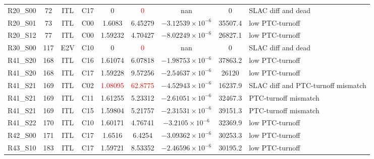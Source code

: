 \begin{landscape}
\begin{table}[!htb]
\begin{tabular}{ccccccccp{}}
    R20\_S00       &             72 & ITL      & C17  &      0                    &  \textcolor{red}{0}      & nan                                        &     0     & SLAC diff and dead\\
    R20\_S01       &             73 & ITL      & C00  &      1.6083               &      6.45279             &  $-3.12539 \times 10^{-6}$                 & 35507.4   & low PTC-turnoff\\
    R20\_S12       &             77 & ITL      & C00  &      1.59232              &      4.70427             &  $-8.02249 \times 10^{-6}$                 & 26827.1   & low PTC-turnoff\\
    R30\_S00       &            117 & E2V      & C10  &      0                    &  \textcolor{red}{0}      & nan                                        & 0         & SLAC diff and dead\\
    R41\_S20       &            168 & ITL      & C16  &      1.61074              &      6.07818             &  $-1.98753 \times 10^{-6}$                 & 37863.2   & low PTC-turnoff\\
    R41\_S20       &            168 & ITL      & C17  &      1.59228              &      9.57256             &  $-2.54637 \times 10^{-6}$                 & 26120     & low PTC-turnoff\\
    R41\_S21       &            169 & ITL      & C02  & \textcolor{red}{1.08095}  & \textcolor{red}{62.8775} &  $-4.52943 \times 10^{-6}$                 & 16237.9   & SLAC diff and PTC-turnoff mismatch\\
    R41\_S21       &            169 & ITL      & C11  &      1.61255              &      5.23312             &  $-2.61051 \times 10^{-6}$                 & 32467.3   & PTC-turnoff mismatch\\
    R41\_S21       &            169 & ITL      & C15  &      1.59804              &      5.21757             &  $-2.31531 \times 10^{-6}$                 & 39151.3   & PTC-turnoff mismatch\\
    R41\_S22       &            170 & ITL      & C10  &      1.60171              &      4.76741             &  $-3.2105  \times 10^{-6}$                 & 32369.9   & low PTC-turnoff\\
    R42\_S00       &            171 & ITL      & C17  &      1.6516               &      6.4254              &  $-3.09362 \times 10^{-6}$                 & 30253.3   & low PTC-turnoff\\
    R43\_S10       &            183 & ITL      & C17  &      1.59721              &      8.53352             &  $-2.46596 \times 10^{-6}$                 & 30195.2   & low PTC-turnoff\\

\end{tabular}
\end{table}
\end{landscape}
